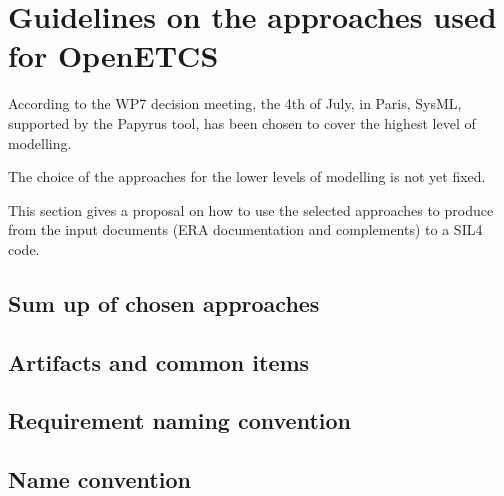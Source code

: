 
\section{Guidelines on the approaches used for OpenETCS}


\begin{comment}
This section will be written for the final version of the document, after the approach and tools tio  use during the project will be selected.
\end{comment}

According to  the WP7 decision meeting, the 4th of July, in Paris, SysML, supported by the Papyrus tool,  has been chosen to  cover the highest level of modelling.

The choice of the approaches for the lower levels of modelling is not yet fixed.

This section gives a proposal on how to use the selected approaches to produce from the input documents (ERA documentation and complements)  to a SIL4 code.

\subsection{Sum up of chosen approaches}
\begin{comment}
list of chosen approaches, and for which activities they are used
\end{comment}


\subsection{Artifacts and common items}

\begin{comment}
list of artifacts used and provided by each approach; common items (data model); types
\end{comment}


\subsection{Requirement naming convention}


\begin{comment}
TODO: Marc Behrens
\end{comment}


\subsection{Name convention}


